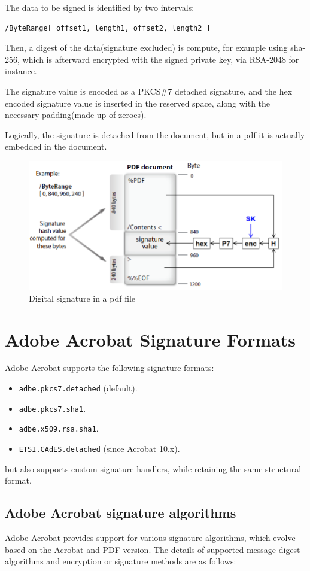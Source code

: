 The data to be signed is identified by two intervals:
\begin{verbatim}
/ByteRange[ offset1, length1, offset2, length2 ]
\end{verbatim}

Then, a digest of the data(signature excluded) is compute, for example
using sha-256, which is afterward encrypted with the signed private
key, via RSA-2048 for instance.

The signature value is encoded as a PKCS\#7 detached signature, and
the hex encoded signature value is inserted in the reserved space,
along with the necessary padding(made up of zeroes).

Logically, the signature is detached from the document, but in a pdf
it is actually embedded in the document.


\begin{figure}[H]
  \includegraphics[width=.6\textwidth]{img/pdf digital signature.png}
  \caption{Digital signature in a pdf file}
  \label{fig:pdf digital signature}
\end{figure}


\section{Adobe Acrobat Signature Formats}
Adobe Acrobat supports the following signature formats:
\begin{itemize}
    \item \texttt{adbe.pkcs7.detached} (default).
    \item \texttt{adbe.pkcs7.sha1}.
    \item \texttt{adbe.x509.rsa.sha1}.
    \item \texttt{ETSI.CAdES.detached} (since Acrobat 10.x).
\end{itemize}
but also supports custom signature handlers, while retaining the same
structural format.

\subsection{Adobe Acrobat signature algorithms}
Adobe Acrobat provides support for various signature algorithms, which
evolve based on the Acrobat and PDF version. The details of supported
message digest algorithms and encryption or signature methods are as
follows:

